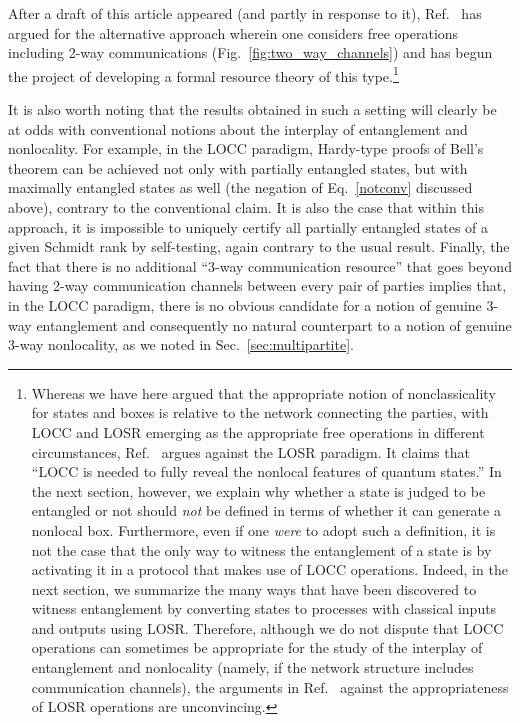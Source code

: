 \documentclass[prx,11pt,letterpaper,twocolumn,accepted=2023-11-27]{quantumarticle}
\newcommand{\rob}{\color{black}}
\newcommand{\blk}{\color{black}}
\theoremstyle{plain}
\theoremstyle{definition}
\begin{document}
After a draft of this article appeared (and partly in response to it), Ref.~\cite{Gour2020RT} has argued for 
\rob the alternative approach wherein one considers free operations including 2-way communications (Fig.~\ref{fig:two_way_channels}) \blk
 and has begun the project of developing a formal resource theory of this type.\footnote{Whereas we have here argued that the appropriate notion of nonclassicality for states and boxes is relative to the network connecting the parties, with LOCC and LOSR emerging as the appropriate free operations in different circumstances, Ref.~\cite{Gour2020RT} argues against the LOSR paradigm.  It claims that \enquote{LOCC is needed to fully reveal the nonlocal features of quantum states.}  In the next section, however, we explain why whether a state  is judged to be entangled or not should {\em not} be defined in terms of whether it can generate a nonlocal box.  Furthermore, even if one {\em were} to adopt such a definition, it is not the case that the only way to witness the entanglement of a state is by activating it in a protocol that makes use of  LOCC operations.  Indeed, in the next section, we summarize the many ways that have been discovered to witness entanglement by converting states to processes with classical inputs and outputs using LOSR. 
Therefore, although we do not dispute that LOCC operations can sometimes be appropriate for the study of the interplay of entanglement and nonlocality (namely, if the network structure includes communication channels),
the arguments in Ref.~\cite{Gour2020RT} against the appropriateness of LOSR operations are unconvincing.
}


It is also worth noting that the results obtained in such a setting will clearly 
be at odds with conventional notions about the interplay of entanglement and nonlocality.  
For example, in the LOCC paradigm, Hardy-type proofs of Bell's theorem can be achieved not only with partially entangled states, but with maximally entangled states as well (the negation of Eq.~\eqref{notconv} discussed above), contrary to the conventional claim.
It is also the case that within this approach, it is impossible to uniquely certify all partially entangled states of a given Schmidt rank by self-testing, again contrary to the usual result. 
Finally, the fact that there is no additional ``3-way communication resource'' that goes beyond having
2-way communication channels between every pair of parties
 implies that, in the LOCC paradigm, there is no obvious candidate for a notion of genuine 3-way entanglement and consequently no natural counterpart to a notion of genuine 3-way nonlocality,  as we noted in  Sec.~\ref{sec:multipartite}.
\end{document}
